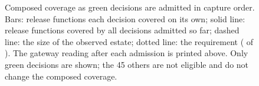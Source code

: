 \begin{figure}[pos=tbp]
\centering

\caption{Composed coverage as green decisions are admitted in capture order. Bars: release functions each decision covered on its own; solid line: release functions covered by all decisions admitted so far; dashed line: the size of the observed estate; dotted line: the requirement (\FixTauQ{} of \FixMq{}). The gateway reading after each admission is printed above. Only green decisions are shown; the 45 others are not eligible and do not change the composed coverage.}
\label{fig:coverage}
\end{figure}
